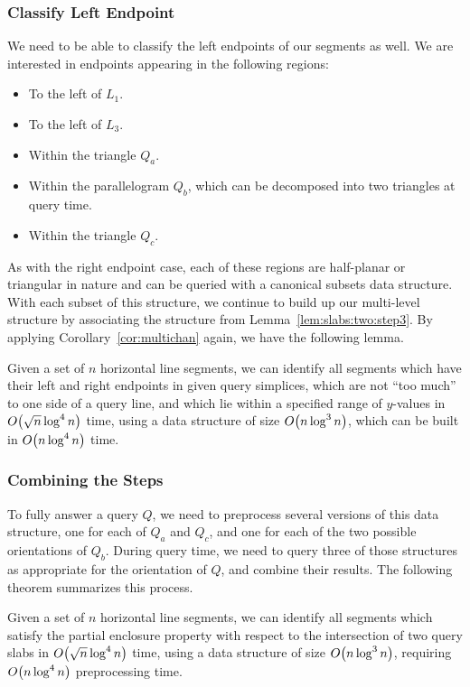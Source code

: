 \subsubsection{Classify Left Endpoint}

We need to be able to classify the left endpoints of our segments as well. We are interested in endpoints appearing in the following regions:
\begin{itemize}
 \item To the left of $L_1$.
 \item To the left of $L_3$.
 \item Within the triangle $Q_a$.
 \item Within the parallelogram $Q_b$, which can be decomposed into two triangles at query time.
 \item Within the triangle $Q_c$.
\end{itemize}

As with the right endpoint case, each of these regions are half-planar or triangular in nature and can be queried with a canonical subsets data structure. 
With each subset of this structure, we continue to build up our multi-level structure by associating the structure from Lemma~\ref{lem:slabs:two:step3}. 
By applying Corollary~\ref{cor:multichan} again, we have the following lemma.

\begin{lemma}
\label{lem:slabs:two:step4}
Given a set of $n$ horizontal line segments, we can identify all segments which have their left and right endpoints in given query simplices, which are not ``too much'' to one side of a query line, and which lie within a specified range of $y$-values in $O\!\left(\sqrt{n}\log^4{n}\right)$ time, using a data structure of size $O\!\left(n\log^3{n}\right)$, which can be built in $O\!\left(n\log^4{n}\right)$ time.
\end{lemma}


\subsubsection{Combining the Steps}

To fully answer a query $Q$, we need to preprocess several versions of this data structure, one for each of $Q_a$ and $Q_c$, and one for each of the two possible orientations of $Q_b$.
During query time, we need to query three of those structures as appropriate for the orientation of $Q$, and combine their results. 
The following theorem summarizes this process.

\begin{theorem}
\label{th:slabs:two}
Given a set of $n$ horizontal line segments, we can identify all segments which satisfy the partial enclosure property with respect to the intersection of two query slabs in $O\!\left(\sqrt{n}\log^4{n}\right)$ time, using a data structure of size $O\!\left(n\log^3{n}\right)$, requiring $O\!\left(n\log^4{n}\right)$ preprocessing time.
\end{theorem}



